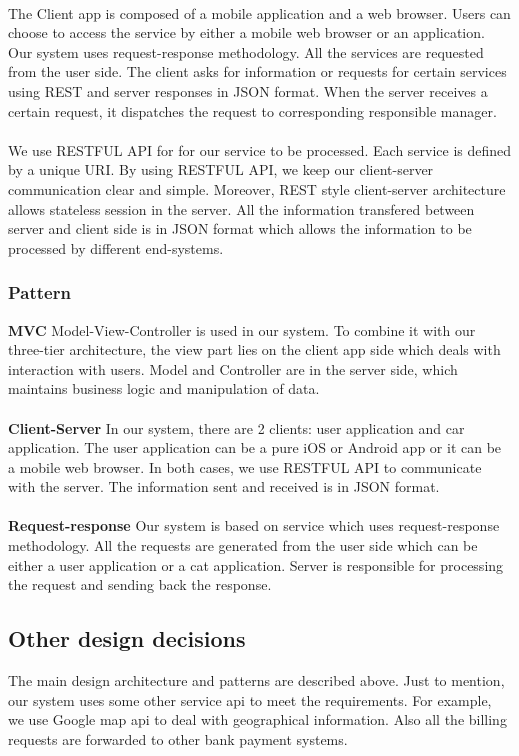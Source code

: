 \documentclass{article}
\begin{document}
	\\The Client app is composed of a mobile application and a web browser. Users can choose to access the service by either a mobile web browser or an application. Our system uses request-response methodology. All the services are requested from the user side. The client asks for information or requests for certain services using REST and server responses in JSON format. When the server receives a certain request, it dispatches the request to corresponding responsible manager. 
	\\
	\\We use RESTFUL API for for our service to be processed. Each service is defined by a unique URI. By using RESTFUL API, we keep our client-server communication clear and simple. Moreover, REST style client-server architecture allows stateless session in the server. All the information transfered between server and client side is in JSON format which allows the information to be processed by different end-systems. 
	\subsubsection{Pattern}
	\textbf{MVC} Model-View-Controller is used in our system. To combine it with our three-tier architecture, the view part lies on the client app side which deals with interaction with users. Model and Controller are in the server side, which maintains business logic and manipulation of data. 
	\\
	\\\textbf{Client-Server} In our system, there are 2 clients: user application and car application. The user application can be a pure iOS or Android app or it can be a mobile web browser. In both cases, we use RESTFUL API to communicate with the server. The information sent and received is in JSON format.
	\\
	\\\textbf{Request-response} Our system is based on service which uses request-response methodology. All the requests are generated from the user side which can be either a user application or a cat application. Server is responsible for processing the request and sending back the response.
	
	\subsection{Other design decisions}
	The main design architecture and patterns are described above. Just to mention, our system uses some other service api to meet the requirements. For example, we use Google map api to deal with geographical information. Also all the billing requests are forwarded to other bank payment systems.  
	\newpage
\end{document}
